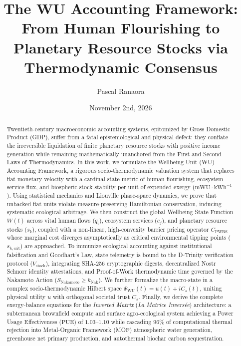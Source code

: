 \documentclass[aps,pre,twocolumn,10pt,superscriptaddress,amsmath,amssymb,amsfonts,floatfix,showkeys]{revtex4-2}
\begin{document}
\title{The WU Accounting Framework: From Human Flourishing to Planetary Resource Stocks via Thermodynamic Consensus}

\author{Pascal Ranaora}

\date{November 2nd, 2026}

\begin{abstract}
Twentieth-century macroeconomic accounting systems, epitomized by Gross Domestic Product (GDP), suffer from a fatal epistemological and physical defect: they conflate the irreversible liquidation of finite planetary resource stocks with positive income generation while remaining mathematically unanchored from the First and Second Laws of Thermodynamics. In this work, we formulate the Wellbeing Unit (WU) Accounting Framework, a rigorous socio-thermodynamic valuation system that replaces fiat monetary velocity with a cardinal state metric of human flourishing, ecosystem service flux, and biospheric stock stability per unit of expended exergy ($\text{mWU}\cdot\text{kWh}^{-1}$). Using statistical mechanics and Liouville phase-space dynamics, we prove that unbacked fiat units violate measure-preserving Hamiltonian conservation, inducing systematic ecological arbitrage. We then construct the global Wellbeing State Function $W(t)$ across vital human flows ($q_i$), ecosystem services ($e_j$), and planetary resource stocks ($s_k$), coupled with a non-linear, high-convexity barrier pricing operator $C_{\text{PWRS}}$ whose marginal cost diverges asymptotically as critical environmental tipping points ($s_{k,\text{crit}}$) are approached. To immunize ecological accounting against institutional falsification and Goodhart's Law, state telemetry is bound to the D-Trinity verification protocol ($V_{\text{stock}}$), integrating SHA-256 cryptographic digests, decentralized Nostr Schnorr identity attestations, and Proof-of-Work thermodynamic time governed by the Nakamoto Action ($S_{\text{Nakamoto}} \ge k_{\text{Nak}}$). We further formalize the macro-state in a complex socio-thermodynamic Hilbert space $\Psi_{\text{WU}}(t) = u(t) + i C_s(t)$, uniting physical utility $u$ with orthogonal societal trust $C_s$. Finally, we derive the complete exergy-balance equations for the \textit{Inverted Matrix} (\textit{La Matrice Invers\'ee}) architecture: a subterranean brownfield compute and surface agro-ecological system achieving a Power Usage Effectiveness ($\text{PUE}$) of $1.03\text{--}1.10$ while cascading $96\%$ of computational thermal rejection into Metal-Organic Framework (MOF) atmospheric water generation, greenhouse net primary production, and autothermal biochar carbon sequestration.
\end{abstract}
\end{document}
